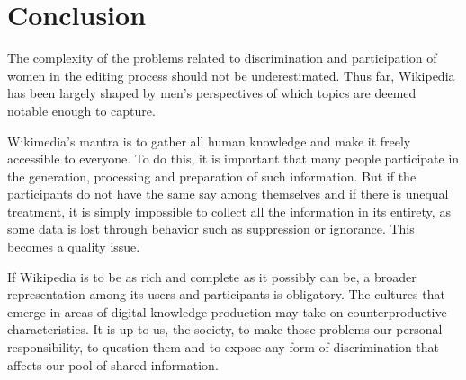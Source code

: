 \documentclass[a4paper, 11pt]{article}
\begin{document}
\section{Conclusion} \label{sec:conclusion}
The complexity of the problems related to discrimination and participation of women in the editing process should not be underestimated. Thus far, Wikipedia has been largely shaped by men’s perspectives of which topics are deemed notable enough to capture.

Wikimedia’s mantra is to gather all human knowledge and make it freely accessible to everyone. To do this, it is important that many people participate in the generation, processing and preparation of such information. But if the participants do not have the same say among themselves and if there is unequal treatment, it is simply impossible to collect all the information in its entirety, as some data is lost through behavior such as suppression or ignorance. This becomes a quality issue.

If Wikipedia is to be as rich and complete as it possibly can be, a broader representation among its users and participants is obligatory. The cultures that emerge in areas of digital knowledge production may take on counterproductive characteristics. It is up to us, the society, to make those problems our personal responsibility, to question them and to expose any form of discrimination that affects our pool of shared information.




\doclicenseThis
\end{document}
